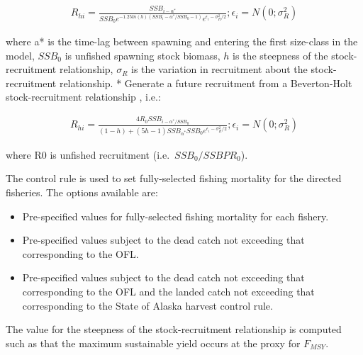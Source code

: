 \documentclass[]{article}
\providecommand{\tightlist}{%
  \setlength{\itemsep}{0pt}\setlength{\parskip}{0pt}}
\begin{document}
\begin{align}
 R_{hi} = \frac {SSB_{i-\alpha^{*} }}
            {SSB_{0}e^{-1.25ln(h)(SSB_{i}-\alpha^{*} / SSB_{0} -1)}e^{\epsilon_{i}-\sigma_{R}^{2}/2}}; \epsilon_{i} = N(0;\sigma_{R}^{2})

\end{align}

where a* is the time-lag between spawning and entering the first
size-class in the model, \(SSB_{0}\) is unfished spawning stock biomass,
\(h\) is the steepness of the stock-recruitment relationship,
\(\sigma_{R}\) is the variation in recruitment about the
stock-recruitment relationship. * Generate a future recruitment from a
Beverton-Holt stock-recruitment relationship , i.e.:

\begin{align}
   R_{hi} = \frac {4R_{0}SSB_{i-\alpha^{*}/SSB_{0}}}
                  {(1-h)+(5h-1)SSB_{\alpha^{*}}SSB_{0}e^{\epsilon_{i}-\sigma_{R}^{2}/2}}; \epsilon_{i} = N(0;\sigma_{R}^{2})
  \end{align}

where R0 is unfished recruitment (i.e.~\(SSB_{0}/SSBPR_{0}\)).

The control rule is used to set fully-selected fishing mortality for the
directed fisheries. The options available are:

\begin{itemize}
\tightlist
\item
  Pre-specified values for fully-selected fishing mortality for each
  fishery.
\item
  Pre-specified values subject to the dead catch not exceeding that
  corresponding to the OFL.
\item
  Pre-specified values subject to the dead catch not exceeding that
  corresponding to the OFL and the landed catch not exceeding that
  corresponding to the State of Alaska harvest control rule.
\end{itemize}

The value for the steepness of the stock-recruitment relationship is
computed such as that the maximum sustainable yield occurs at the proxy
for \(F_{MSY}\).
\end{document}
